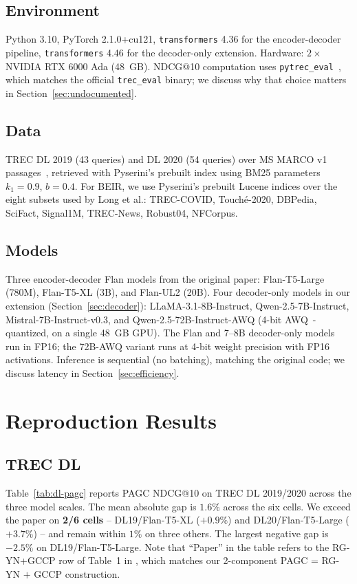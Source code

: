 \documentclass[sigconf]{acmart}
\begin{document}
\subsection{Environment}
Python 3.10, PyTorch 2.1.0+cu121, \texttt{transformers} 4.36 for the
encoder-decoder pipeline, \texttt{transformers} 4.46 for the
decoder-only extension. Hardware: $2\times$NVIDIA RTX 6000 Ada (48~GB).
NDCG@10 computation uses \texttt{pytrec\_eval}~\cite{vangysel2018pytreceval}, which matches the
official \texttt{trec\_eval} binary; we discuss why that choice
matters in Section~\ref{sec:undocumented}.

\subsection{Data}
TREC DL 2019 (43 queries) and DL 2020 (54 queries) over MS MARCO
v1 passages~\cite{bajaj2016msmarco}, retrieved with Pyserini's
prebuilt index using BM25 parameters $k_1{=}0.9$, $b{=}0.4$.
For BEIR, we use Pyserini's prebuilt Lucene indices over the eight
subsets used by Long et al.: TREC-COVID, Touch\'e-2020, DBPedia,
SciFact, Signal1M, TREC-News, Robust04, NFCorpus.

\subsection{Models}
Three encoder-decoder Flan models from the original paper:
Flan-T5-Large (780M), Flan-T5-XL (3B), and Flan-UL2 (20B). Four
decoder-only models in our extension (Section~\ref{sec:decoder}):
LLaMA-3.1-8B-Instruct, Qwen-2.5-7B-Instruct, Mistral-7B-Instruct-v0.3,
and Qwen-2.5-72B-Instruct-AWQ (4-bit AWQ~\cite{lin2024awq}-quantized, on a single
48~GB GPU). The Flan and 7--8B decoder-only models run in FP16; the
72B-AWQ variant runs at 4-bit weight precision with FP16 activations.
Inference is sequential (no batching), matching the original code;
we discuss latency in Section~\ref{sec:efficiency}.

\section{Reproduction Results}
\label{sec:reproduction}

\subsection{TREC DL}
Table~\ref{tab:dl-pagc} reports PAGC NDCG@10 on TREC DL 2019/2020
across the three model scales. The mean absolute gap is
$1.6\%$ across the six cells. We exceed the paper on
\textbf{2/6 cells} -- DL19/Flan-T5-XL ($+0.9\%$) and
DL20/Flan-T5-Large ($+3.7\%$) -- and remain within $1\%$ on three
others. The largest negative gap is $-2.5\%$ on
DL19/Flan-T5-Large. Note that ``Paper'' in the table refers to
the RG-YN+GCCP row of Table~1 in \cite{long2025precise}, which
matches our 2-component PAGC = RG-YN $+$ GCCP construction.
\end{document}
